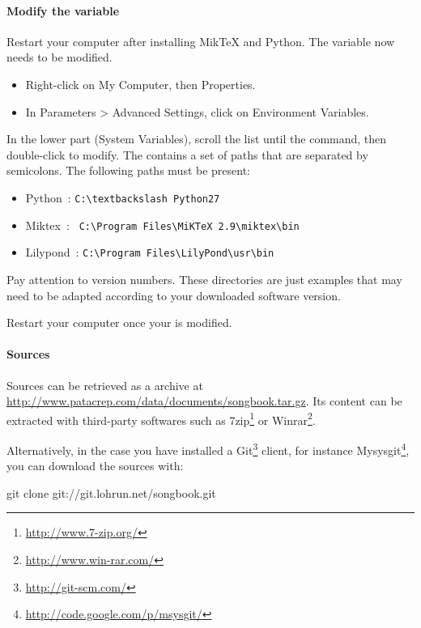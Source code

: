 \paragraph{Modify the  variable}

Restart your computer after installing MikTeX and Python. The
 variable now needs to be modified.
\begin{itemize}
\item Right-click on My Computer, then Properties.
\item In Parameters > Advanced Settings, click on Environment
  Variables.
\end{itemize}

In the lower part (System Variables), scroll the list until the
 command, then double-click to modify. The 
contains a set of paths that are separated by semicolons. The
following paths must be present:
\begin{itemize}
\item Python~: \verb#C:\textbackslash Python27#
\item Miktex~: \verb# C:\Program Files\MiKTeX 2.9\miktex\bin#
\item Lilypond~: \verb#C:\Program Files\LilyPond\usr\bin#
\end{itemize}

\begin{nota}
Pay attention to version numbers. These directories are just examples
that may need to be adapted according to your downloaded software
version.
\end{nota}

Restart your computer once your  is modified.

\paragraph{Sources}

Sources can be retrieved as a  archive at
\url{http://www.patacrep.com/data/documents/songbook.tar.gz}. Its
content can be extracted with third-party softwares such as
7zip\footnote{\url{http://www.7-zip.org/}} or
Winrar\footnote{\url{http://www.win-rar.com/}}.

Alternatively, in the case you have installed a
Git\footnote{\url{http://git-scm.com/}} client, for instance
Mysysgit\footnote{\url{http://code.google.com/p/msysgit/}}, you can
download the sources with:

\begin{unix}
  git clone git://git.lohrun.net/songbook.git
\end{unix}

